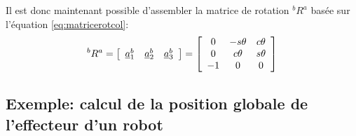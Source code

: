 Il est donc maintenant possible d'assembler la matrice de rotation $^bR^a$ basée sur l'équation \eqref{eq:matricerotcol}:
\begin{align}
	^bR^a =\left[ \begin{array}{c c c}
					  \underline{a}_1^b  & \underline{a}_2^b & \underline{a}_3^b
	\end{array}  \right]
	= \left[ \begin{array}{c c c}
				 0 & -s\theta & c\theta \\
				 0 & c\theta & s\theta \\
				 -1 & 0 & 0
	\end{array}  \right]
\end{align}


\subsection{Exemple: calcul de la position globale de l'effecteur d'un robot}
\label{sec:exer-cinematique-base}
%

